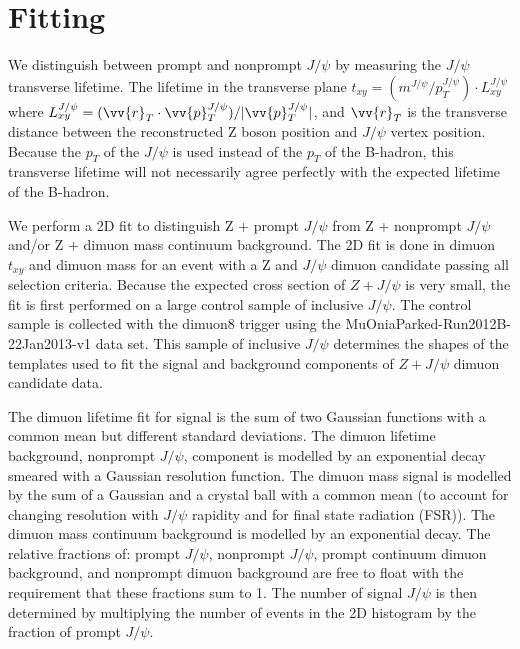 \documentclass[a4paper,12pt]{article}
\begin{document}
\section{Fitting}
We distinguish between prompt and nonprompt $J\slash \psi$ by measuring the $J\slash \psi$ transverse lifetime. The lifetime in the transverse plane $t_{xy} = (m^{J\slash \psi} \slash p_{T}^{J\slash \psi}) \cdot L^{J\slash \psi}_{xy}$ where $L^{J\slash \psi}_{xy} = (\vv{r}_{T} \cdot \vv{p}_{T}^{J\slash \psi})\slash|\vv{p}_{T}^{J\slash \psi}|$, and $\vv{r}_{T}$ is the transverse distance between the reconstructed Z boson position and $J\slash \psi$ vertex position. Because the $p_T$ of the $J\slash \psi$ is used instead of the $p_T$ of the B-hadron, this transverse lifetime will not necessarily agree perfectly with the expected lifetime of the B-hadron.

We perform a 2D fit to distinguish Z + prompt $J\slash \psi$ from Z + nonprompt $J\slash \psi$ and/or Z + dimuon mass continuum background. The 2D fit is done in dimuon $t_{xy}$ and dimuon mass for an event with a Z and $J\slash \psi$ dimuon candidate passing all selection criteria. Because the expected cross section of $Z + J\slash \psi$ is very small, the fit is first performed on a large control sample of inclusive $J\slash \psi$. The control sample is collected with the dimuon8 trigger using the MuOniaParked-Run2012B-22Jan2013-v1 data set. This sample of inclusive $J\slash \psi$ determines the shapes of the templates used to fit the signal and background components of $Z + J\slash \psi$ dimuon candidate data.

The dimuon lifetime fit for signal is the sum of two Gaussian functions with a common mean but different standard deviations. The dimuon lifetime background, nonprompt $J\slash \psi$, component is modelled by an exponential decay smeared with a Gaussian resolution function. The dimuon mass signal is modelled by the sum of a Gaussian and a crystal ball with a common mean (to account for changing resolution with $J\slash \psi$ rapidity and for final state radiation (FSR)). The dimuon mass continuum background is modelled by an exponential decay. The relative fractions of: prompt $J\slash \psi$, nonprompt $J\slash \psi$, prompt continuum dimuon background, and nonprompt dimuon background are free to float with the requirement that these fractions sum to 1. The number of signal $J\slash \psi$ is then determined by multiplying the number of events in the 2D histogram by the fraction of prompt $J\slash \psi$.
\end{document}
